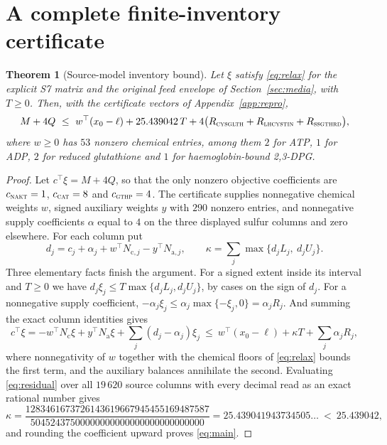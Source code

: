 \documentclass[11pt,a4paper]{article}
\theoremstyle{plain}
\newtheorem{theorem}{Theorem}[section]
\theoremstyle{definition}
\theoremstyle{remark}
\newcommand{\Nc}{N_{\mathrm c}}
\newcommand{\Na}{N_{\mathrm a}}
\newcommand{\rx}[1]{\textnormal{\textsc{#1}}}
\begin{document}
\section{A complete finite-inventory certificate}\label{sec:certificate}

\begin{theorem}[Source-model inventory bound]\label{thm:inventory}
Let $\xi$ satisfy \eqref{eq:relax} for the explicit S7 matrix and the original
feed envelope of Section~\ref{sec:media}, with $T\ge0$. Then, with the
certificate vectors of Appendix~\ref{app:repro},
\begin{equation}\label{eq:main}
M+4Q\ \le\ w^{\top}(x_0-\ell)+25.439042\,T
+4\bigl(R_{\rx{cysglth}}+R_{\rx{lhcystin}}+R_{\rx{ssgthrd}}\bigr),
\end{equation}
where $w\ge0$ has $53$ nonzero chemical entries, among them $2$ for ATP, $1$
for ADP, $2$ for reduced glutathione and $1$ for haemoglobin-bound
2,3-DPG.
\end{theorem}

\begin{proof}
Let $c^{\top}\xi=M+4Q$, so that the only nonzero objective coefficients are
$c_{\rx{nakt}}=1$, $c_{\rx{cat}}=8$ and $c_{\rx{gthp}}=4$. The certificate
supplies nonnegative chemical weights $w$, signed auxiliary weights $y$ with
$290$ nonzero entries, and nonnegative supply coefficients $\alpha$ equal to
$4$ on the three displayed sulfur columns and zero elsewhere. For each column
put
\begin{equation}\label{eq:residual}
d_j=c_j+\alpha_j+w^{\top}N_{\mathrm c,j}-y^{\top}N_{\mathrm a,j},
\qquad
\kappa=\sum_j\max\{d_jL_j,\ d_jU_j\}.
\end{equation}
Three elementary facts finish the argument. For a signed extent inside its
interval and $T\ge0$ we have $d_j\xi_j\le T\max\{d_jL_j,d_jU_j\}$, by cases on
the sign of $d_j$. For a nonnegative supply coefficient,
$-\alpha_j\xi_j\le\alpha_j\max\{-\xi_j,0\}=\alpha_jR_j$. And summing the exact
column identities gives
\[
c^{\top}\xi=-w^{\top}\Nc\xi+y^{\top}\Na\xi+\sum_j(d_j-\alpha_j)\xi_j
\ \le\ w^{\top}(x_0-\ell)+\kappa T+\sum_j\alpha_jR_j ,
\]
where nonnegativity of $w$ together with the chemical floors of
\eqref{eq:relax} bounds the first term, and the auxiliary balances annihilate
the second. Evaluating \eqref{eq:residual} over all $19\,620$ source columns
with every decimal read as an exact rational number gives
\begin{equation}\label{eq:kappa}
\kappa=\frac{1283461673726143619667945455169487587}
{50452437500000000000000000000000000}
=25.439041943734505\ldots\ <\ 25.439042 ,
\end{equation}
and rounding the coefficient upward proves \eqref{eq:main}.
\end{proof}
\end{document}
